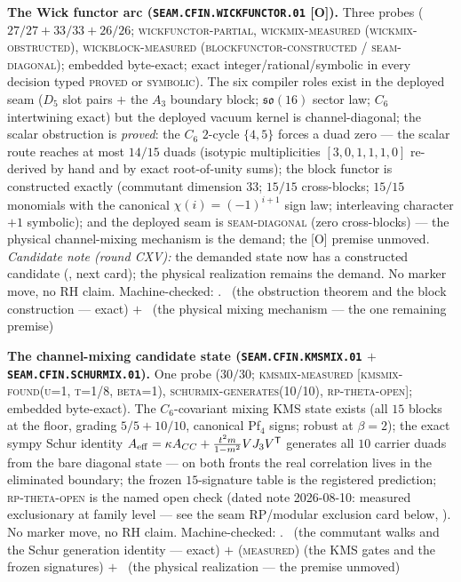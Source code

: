 \documentclass[11pt,a4paper]{article}
\theoremstyle{definition}
\begin{document}
\par\smallskip\noindent\textbf{The Wick functor arc
(\texttt{SEAM.CFIN.\allowbreak WICKFUNCTOR.01} [O]).}
Three probes ($27/27 + 33/33 + 26/26$;
\textsc{wickfunctor-partial}, \textsc{wickmix-measured
(wickmix-obstructed)}, \textsc{wickblock-measured
(blockfunctor-constructed / seam-diagonal)}; embedded
byte-exact; exact integer/rational/symbolic in every decision
typed \textsc{proved} or \textsc{symbolic}).  The six compiler
roles exist in the deployed seam ($D_5$ slot pairs $+$ the
$A_3$ boundary block; $\mathfrak{so}(16)$ sector law; $C_6$
intertwining exact) but the deployed vacuum kernel is
channel-diagonal; the scalar obstruction is \emph{proved}: the
$C_6$ $2$-cycle $\{4, 5\}$ forces a duad zero --- the scalar
route reaches at most $14/15$ duads (isotypic multiplicities
$[3,0,1,1,1,0]$ re-derived by hand and by exact root-of-unity
sums); the block functor is constructed exactly (commutant
dimension $33$; $15/15$ cross-blocks; $15/15$ monomials with
the canonical $\chi(i) = (-1)^{i+1}$ sign law; interleaving
character $+1$ symbolic); and the deployed seam is
\textsc{seam-diagonal} (zero cross-blocks) --- the physical
channel-mixing mechanism is the demand; the [O] premise
unmoved.  \emph{Candidate note (round CXV):} the demanded state
now has a constructed candidate
(, next card); the physical
realization remains the demand.  No marker move, no RH claim.
Machine-checked: .
\mE\ (the obstruction theorem and the block construction ---
exact) $+$ \mO\ (the physical mixing mechanism --- the one
remaining premise)
\par\smallskip

\par\smallskip\noindent\textbf{The channel-mixing candidate
state (\texttt{SEAM.CFIN.\allowbreak KMSMIX.01} $+$
\texttt{SEAM.CFIN.\allowbreak SCHURMIX.01}).}
One probe ($30/30$; \textsc{kmsmix-measured [kmsmix-found(u=1,
t=1/8, beta=1), schurmix-generates(10/10), rp-theta-open]};
embedded byte-exact).  The $C_6$-covariant mixing KMS state
exists (all $15$ blocks at the floor, grading $5/5 + 10/10$,
canonical Pf$_4$ signs; robust at $\beta = 2$); the exact sympy
Schur identity $A_{\rm eff} = \kappa A_{CC} + \tfrac{t^2
m}{1-m^2} V J_3 V^{\mathsf T}$ generates all $10$ carrier duads
from the bare diagonal state --- on both fronts the real
correlation lives in the eliminated boundary; the frozen
$15$-signature table is the registered prediction;
\textsc{rp-theta-open} is the named open check (dated note
2026-08-10: measured exclusionary at family level --- see the
seam RP/modular exclusion card below,
).  No marker move,
no RH claim.
Machine-checked: .
\mE\ (the commutant walks and the Schur generation identity ---
exact) $+$ (\textsc{measured}) (the KMS gates and the frozen
signatures) $+$ \mO\ (the physical realization --- the premise
unmoved)
\par\smallskip
\end{document}
